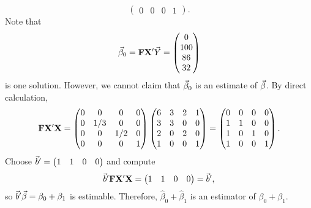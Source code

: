 \begin{Example}{}{}
\[\begin{pmatrix}
            0 & 0   & 0   & 1
        \end{pmatrix}. \]
    Note that
    \[ \vec{\beta}_0=\mathbf{F}\mathbf{X}'\vec{Y}=
        \begin{pmatrix}
            0 \\100\\86\\32
        \end{pmatrix} \]
    is one solution.
    However, we cannot claim that $ \vec{\beta}_0 $ is an estimate of $ \vec{\beta} $.
    By direct calculation,
    \[ \mathbf{F}\mathbf{X}'\mathbf{X}
        =\begin{pmatrix}
            0 & 0   & 0   & 0 \\
            0 & 1/3 & 0   & 0 \\
            0 & 0   & 1/2 & 0 \\
            0 & 0   & 0   & 1
        \end{pmatrix}\begin{pmatrix}
            6 & 3 & 2 & 1 \\
            3 & 3 & 0 & 0 \\
            2 & 0 & 2 & 0 \\
            1 & 0 & 0 & 1
        \end{pmatrix}=\begin{pmatrix}
            0 & 0 & 0 & 0 \\
            1 & 1 & 0 & 0 \\
            1 & 0 & 1 & 0 \\
            1 & 0 & 0 & 1
        \end{pmatrix}. \]
    Choose $ \vec{b}'=\begin{pmatrix}
            1 & 1 & 0 & 0
        \end{pmatrix} $ and compute
    \[ \vec{b}'\mathbf{F}\mathbf{X}'\mathbf{X}=\begin{pmatrix}
            1 & 1 & 0 & 0
        \end{pmatrix}=\vec{b}', \]
    so $ \vec{b}'\vec{\beta}=\beta_0+\beta_1 $ is estimable. Therefore, $ \hat{\beta}_0+\hat{\beta}_1 $ is an estimator of $ \beta_0+\beta_1 $.
\end{Example}